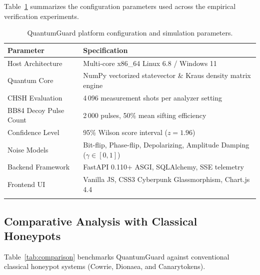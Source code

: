 \documentclass[pdflatex,sn-mathphys-num]{sn-jnl}
\theoremstyle{thmstyleone}
\theoremstyle{thmstyletwo}
\theoremstyle{thmstylethree}
\begin{document}
Table~\ref{tab:config} summarizes the configuration parameters used across the empirical verification experiments.

\begin{table}[h]
\caption{QuantumGuard platform configuration and simulation parameters.}\label{tab:config}
\begin{tabular*}{\textwidth}{@{\extracolsep\fill}lp{8cm}@{}}
\toprule
Parameter & Specification \\
\midrule
Host Architecture & Multi-core x86\_64 Linux 6.8 / Windows 11 \\
Quantum Core & NumPy vectorized statevector \& Kraus density matrix engine \\
CHSH Evaluation & 4\,096 measurement shots per analyzer setting \\
BB84 Decoy Pulse Count & 2\,000 pulses, 50\% mean sifting efficiency \\
Confidence Level & 95\% Wilson score interval ($z = 1.96$) \\
Noise Models & Bit-flip, Phase-flip, Depolarizing, Amplitude Damping ($\gamma \in [0, 1]$) \\
Backend Framework & FastAPI 0.110+ ASGI, SQLAlchemy, SSE telemetry \\
Frontend UI & Vanilla JS, CSS3 Cyberpunk Glassmorphism, Chart.js 4.4 \\
\botrule
\end{tabular*}
\end{table}

\subsection{Comparative Analysis with Classical Honeypots}

Table~\ref{tab:comparison} benchmarks QuantumGuard against conventional classical honeypot systems (Cowrie, Dionaea, and Canarytokens).
\end{document}
